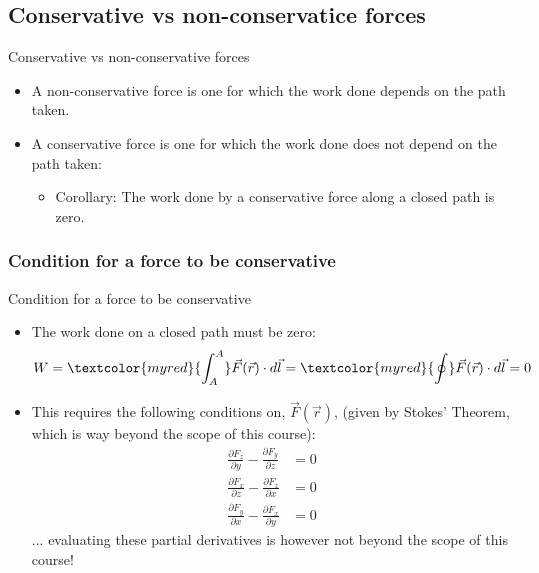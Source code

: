 \documentclass[aspectratio=169,
hyperref={colorlinks,urlcolor=blue}
]{beamer}
\begin{document}
\subsection{Conservative vs non-conservatice forces}
\label{subsec:conservativevsnonconservativeforces}
\begin{frame}{Conservative vs non-conservative forces}
\begin{itemize}
\item A non-conservative force is one for which the work done depends on the path taken.
\item A conservative force is one for which the work done does not depend on the path taken:
\begin{itemize}
\item Corollary: The work done by a conservative force along a closed path is zero.
\end{itemize}
\end{itemize}
\end{frame}




\subsubsection{Condition for a force to be conservative}
\label{subsec:conditionforconservativeforce}
\begin{frame}{Condition for a force to be conservative}
\begin{itemize}
\item The work done on a closed path must be zero:
\begin{align*}
W=\textcolor{myred}{\int_A^A}\vec F(\vec r) \cdot d\vec l = \textcolor{myred}{\oint}\vec F(\vec r) \cdot d\vec l = 0
\end{align*}
\item This requires the following conditions on, $\vec F(\vec r)$, (given by Stokes' Theorem, which is way beyond the scope of this course):
\begin{align*}
\frac{\partial F_z}{\partial y}-\frac{\partial F_y}{\partial z}&=0\\
\frac{\partial F_x}{\partial z}-\frac{\partial F_z}{\partial x}&=0\\
\frac{\partial F_y}{\partial x}-\frac{\partial F_x}{\partial y}&=0
\end{align*}
... evaluating these partial derivatives is however not beyond the scope of this course!
\end{itemize}
\end{frame}
\end{document}
